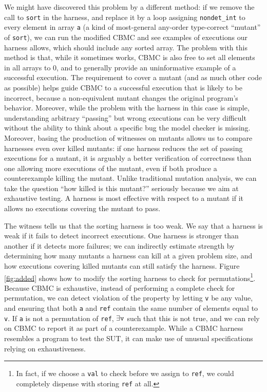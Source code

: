 \documentclass[conference]{IEEEtran}
\begin{document}
We might have discovered this problem by a different method: if we
remove the call to {\tt sort} in the harness, and replace it by a loop
assigning {\tt nondet\_int} to every element in array {\tt a} (a kind of
most-general any-order type-correct ``mutant'' of {\tt sort}), we can run
the modified CBMC and see examples of executions our harness allows,
which should include any sorted array.  The problem with this
method is that, while it sometimes works, CBMC is also free to
set all elements in all arrays to 0, and to generally provide an
uninformative example of a successful execution.  The requirement to
cover a mutant (and as much other code as possible) helps guide CBMC
to a successful execution that is likely to be incorrect,
because a non-equivalent mutant changes the original program's behavior.  Moreover, while the
problem with the harness in this case is simple, understanding
arbitrary ``passing'' but wrong executions can be very difficult
without the ability to think about a specific bug the model
checker is missing.  Moreover, basing the production of witnesses on
mutants allows us to compare harnesses even over killed mutants:  if
one harness reduces the set of passing executions for a mutant, it is
arguably a better verification of correctness than one allowing more
executions of the mutant, even if both produce a counterexample
killing the mutant.  Unlike traditional mutation analysis, we can take
the question ``how killed is this mutant?'' seriously because we aim at
exhaustive testing.  A harness is most effective with respect to a
mutant if it allows no executions covering the mutant to pass.

The witness tells us that the sorting harness is too weak.  We
say that a harness is weak if it fails to detect incorrect executions.
One harness is stronger than another if it detects more failures; we
can indirectly estimate strength by determining how many mutants a
harness can kill at a given problem size, and how executions covering
killed mutants can still satisfy the harness.  Figure \ref{fig:added}
shows how to modify the sorting harness to check for permutations\footnote{In fact, if we choose a {\tt val} to check
  before we assign to {\tt ref}, we
  could completely dispense with storing {\tt ref} at all.}.  Because CBMC is exhaustive,
instead of performing a complete check for permutation, we can detect
violation of the property by letting {\tt v} be any value, and
ensuring that both {\tt a} and {\tt ref} contain the same
number of elements equal to {\tt v}.  If {\tt a} is not
a permutation of {\tt ref}, $\exists {\tt v}$ such that this is not
true, and we can rely on CBMC to report it as part of a
counterexample.  While a CBMC harness
resembles a program to test the SUT, it can make use of unusual specifications
relying on exhaustiveness.
\end{document}
